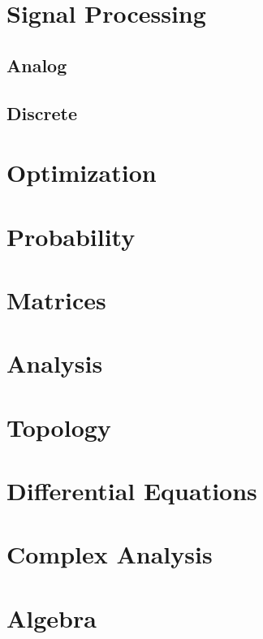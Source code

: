 \documentclass[journal]{IEEEtran}
\begin{document}
\newpage


\tableofcontents

\newpage
\onecolumn


\renewcommand{\thetable}{\theenumi}

\section{Signal Processing}
\subsection{Analog}

\subsection{Discrete}

\section{Optimization}

\section{Probability}

\section{Matrices}

\section{Analysis}

\section{Topology}

\section{Differential Equations}

\section{Complex Analysis}

\section{Algebra}

\end{document}

